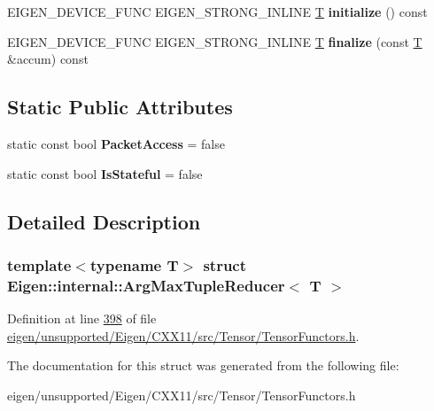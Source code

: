 \begin{DoxyCompactItemize}
\item 
\mbox{\label{struct_eigen_1_1internal_1_1_arg_max_tuple_reducer_a0637b0519eae7a318cb992348cc13b79}} 
E\+I\+G\+E\+N\+\_\+\+D\+E\+V\+I\+C\+E\+\_\+\+F\+U\+NC E\+I\+G\+E\+N\+\_\+\+S\+T\+R\+O\+N\+G\+\_\+\+I\+N\+L\+I\+NE \hyperlink{group___sparse_core___module}{T} {\bfseries initialize} () const
\item 
\mbox{\label{struct_eigen_1_1internal_1_1_arg_max_tuple_reducer_a407ab409b07907ffd472dea343c4f490}} 
E\+I\+G\+E\+N\+\_\+\+D\+E\+V\+I\+C\+E\+\_\+\+F\+U\+NC E\+I\+G\+E\+N\+\_\+\+S\+T\+R\+O\+N\+G\+\_\+\+I\+N\+L\+I\+NE \hyperlink{group___sparse_core___module}{T} {\bfseries finalize} (const \hyperlink{group___sparse_core___module}{T} \&accum) const
\end{DoxyCompactItemize}
\subsection*{Static Public Attributes}
\begin{DoxyCompactItemize}
\item 
\mbox{\label{struct_eigen_1_1internal_1_1_arg_max_tuple_reducer_a8a78d70e712a205758b8bf47fd061298}} 
static const bool {\bfseries Packet\+Access} = false
\item 
\mbox{\label{struct_eigen_1_1internal_1_1_arg_max_tuple_reducer_acb7a64e48eda1f01a25f760f532d639c}} 
static const bool {\bfseries Is\+Stateful} = false
\end{DoxyCompactItemize}


\subsection{Detailed Description}
\subsubsection*{template$<$typename T$>$\newline
struct Eigen\+::internal\+::\+Arg\+Max\+Tuple\+Reducer$<$ T $>$}



Definition at line \hyperlink{eigen_2unsupported_2_eigen_2_c_x_x11_2src_2_tensor_2_tensor_functors_8h_source_l00398}{398} of file \hyperlink{eigen_2unsupported_2_eigen_2_c_x_x11_2src_2_tensor_2_tensor_functors_8h_source}{eigen/unsupported/\+Eigen/\+C\+X\+X11/src/\+Tensor/\+Tensor\+Functors.\+h}.



The documentation for this struct was generated from the following file\+:\begin{DoxyCompactItemize}
\item 
eigen/unsupported/\+Eigen/\+C\+X\+X11/src/\+Tensor/\+Tensor\+Functors.\+h\end{DoxyCompactItemize}
